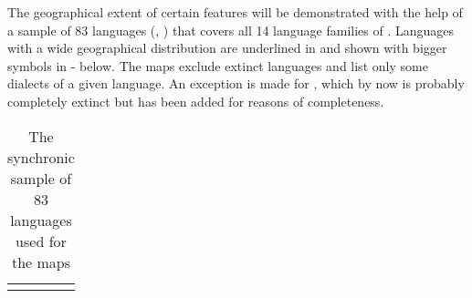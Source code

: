 The geographical extent of certain features will be demonstrated with the help of a  sample of 83 languages (, ) that covers all 14 language families of . Languages with a wide geographical distribution are underlined in  and shown with bigger symbols in - below. The maps exclude extinct languages and list only some dialects of a given language. An exception is made for , which by now is probably completely extinct but has been added for reasons of completeness.

\begin{table}
\caption{The synchronic sample of 83 languages used for the maps}
\label{tab:6:15}
\small
\begin{tabularx}{\textwidth}{XXr}
\lsptoprule


\end{tabularx}
\end{table}
